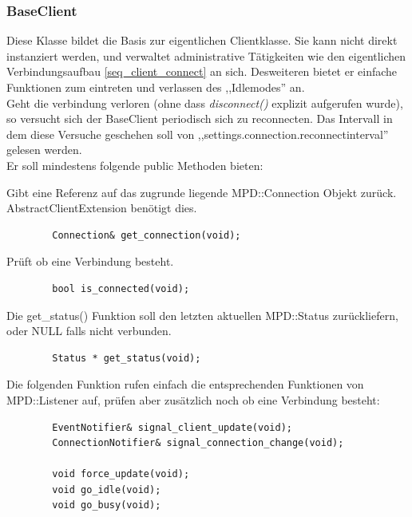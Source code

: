 \subsubsection{BaseClient}
Diese Klasse bildet die Basis zur eigentlichen Clientklasse. Sie kann nicht direkt instanziert werden,
und verwaltet administrative Tätigkeiten wie den eigentlichen Verbindungsaufbau \ref{seq_client_connect} an sich. 
Desweiteren bietet er einfache Funktionen zum eintreten und verlassen des ,,Idlemodes'' an.
\\
Geht die verbindung verloren (ohne dass \emph{disconnect()} explizit aufgerufen wurde), so versucht sich der BaseClient periodisch sich zu reconnecten.
Das Intervall in dem diese Versuche geschehen soll von ,,settings.connection.reconnectinterval'' gelesen werden.
\\
Er soll mindestens folgende public Methoden bieten:

Gibt eine Referenz auf das zugrunde liegende MPD::Connection Objekt zurück. 
AbstractClientExtension benötigt dies.
\begin{verbatim}
        Connection& get_connection(void);
\end{verbatim}

Prüft ob eine Verbindung besteht.
\begin{verbatim}
        bool is_connected(void);
\end{verbatim}
Die get\_status() Funktion soll den letzten aktuellen MPD::Status zurückliefern,
oder NULL falls nicht verbunden. 
\begin{verbatim}        
        Status * get_status(void);
\end{verbatim}

Die folgenden Funktion rufen einfach die entsprechenden Funktionen von MPD::Listener auf,
prüfen aber zusätzlich noch ob eine Verbindung besteht:
\begin{verbatim}
        EventNotifier& signal_client_update(void);
        ConnectionNotifier& signal_connection_change(void);

        void force_update(void);
        void go_idle(void);
        void go_busy(void);
\end{verbatim}

